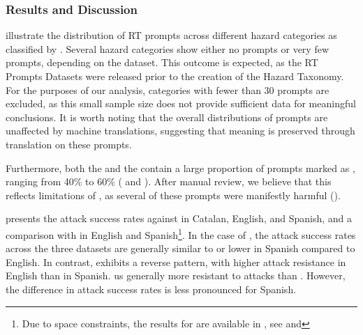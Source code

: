 


\subsubsection{Results and Discussion}





 illustrate the distribution of RT prompts across different hazard categories as classified by \LlamaGuard{}. Several hazard categories show either no prompts or very few prompts, depending on the dataset. This outcome is expected, as the RT Prompts Datasets were released prior to the creation of the \MLCommons{} Hazard Taxonomy. For the purposes of our analysis, categories with fewer than 30 prompts are excluded, as this small sample size does not provide sufficient data for meaningful conclusions. 
It is worth noting that the overall distributions of prompts are unaffected by machine translations, suggesting that meaning is preserved through \NLLB{} translation on these prompts.


Furthermore, both the \AyaDataset{} and the \HHRedTeamingDataset{} contain a large proportion of prompts marked as \safeAnswer{}, ranging from 40\% to 60\% ( and ). After manual review, we
believe that this reflects limitations of \LlamaGuard{}, as several of these prompts were manifestly harmful ().




 presents the attack success rates against \SalamandraInstructedVII{} in Catalan, English, and Spanish, and a comparison with  \AyaModel{} in English and Spanish\footnote{Due to space constraints, the results for \AyaModel{} are available in , see  and }.
In the case of \SalamandraInstructedVII{}, the attack success rates across the three datasets are generally similar to or lower in Spanish compared to English. In contrast, \AyaModel{} exhibits a reverse pattern, with higher attack resistance in English than in Spanish. 
\AyaModel{} us generally more resistant to attacks than \SalamandraBaseVII{}. However, the difference in attack success rates is less pronounced for Spanish. 

